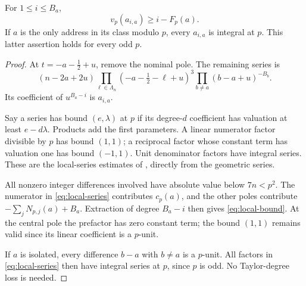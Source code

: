 \begin{lemma}\label{lem:local}
For $1\le i\le B_a$,
\begin{equation}\label{eq:local-bound}
 v_p(a_{i,a})\ge i-F_p(a).
\end{equation}
If $a$ is the only address in its class modulo $p$, every $a_{i,a}$
is integral at $p$. This latter assertion holds for every odd $p$.
\end{lemma}
\begin{proof}
At $t=-a-\tfrac12+u$, remove the nominal pole. The remaining series is
\begin{equation}\label{eq:local-series}
 (n-2a+2u)\prod_{\ell\in\Lambda_n}(-a-\tfrac12-\ell+u)^3
                  \prod_{b\ne a}(b-a+u)^{-B_b}.
\end{equation}
Its coefficient of $u^{B_a-i}$ is $a_{i,a}$.

Say a series has bound $(e,\lambda)$ at $p$ if its degree-$d$
coefficient has valuation at least $e-d\lambda$. Products add the
first parameters. A linear numerator factor divisible by $p$ has
bound $(1,1)$; a reciprocal factor whose constant term has valuation
one has bound $(-1,1)$. Unit denominator factors have integral
series. These are the local-series estimates of
\cite[Section 4.1]{krisman}, directly from the geometric series.

All nonzero integer differences involved have absolute value below
$7n<p^2$. The numerator in \eqref{eq:local-series} contributes
$c_p(a)$, and the other poles contribute
$-\sum_jN_{p,j}(a)+B_a$. Extraction of degree $B_a-i$ then gives
\eqref{eq:local-bound}. At the central pole the prefactor has zero
constant term; the bound $(1,1)$ remains valid since its linear
coefficient is a $p$-unit.

If $a$ is isolated, every difference $b-a$ with $b\ne a$ is a
$p$-unit. All factors in \eqref{eq:local-series} then have integral
series at $p$, since $p$ is odd. No Taylor-degree loss is needed.
\end{proof}

